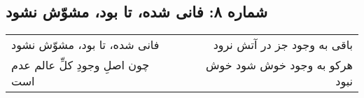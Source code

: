 \begin{center}
\section*{شماره ۸: فانی شده، تا بود، مشوّش نشود}
\label{sec:008}
\begin{longtable}{l p{0.5cm} r}
فانی شده، تا بود، مشوّش نشود
&&
باقی به وجود جز در آتش نرود
\\
چون اصلِ وجودِ کلِّ عالم عدم است
&&
هرکو به وجود خوش شود خوش نبود
\\
\end{longtable}
\end{center}
